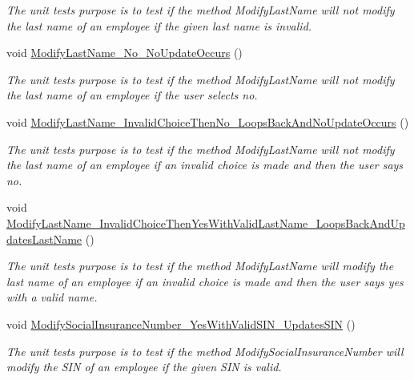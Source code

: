 \begin{DoxyCompactItemize}
\begin{DoxyCompactList}\small\item\em The unit test\textquotesingle{}s purpose is to test if the method Modify\+Last\+Name will not modify the last name of an employee if the given last name is invalid. \end{DoxyCompactList}\item 
void \hyperlink{class_the_company_1_1_tests_1_1_modify_employee_tests_a4c868bee63f88796b8437264a84af46a}{Modify\+Last\+Name\+\_\+\+No\+\_\+\+No\+Update\+Occurs} ()
\begin{DoxyCompactList}\small\item\em The unit test\textquotesingle{}s purpose is to test if the method Modify\+Last\+Name will not modify the last name of an employee if the user selects no. \end{DoxyCompactList}\item 
void \hyperlink{class_the_company_1_1_tests_1_1_modify_employee_tests_ad8c2ed861e1f27869f3eda59afafd157}{Modify\+Last\+Name\+\_\+\+Invalid\+Choice\+Then\+No\+\_\+\+Loops\+Back\+And\+No\+Update\+Occurs} ()
\begin{DoxyCompactList}\small\item\em The unit test\textquotesingle{}s purpose is to test if the method Modify\+Last\+Name will not modify the last name of an employee if an invalid choice is made and then the user says no. \end{DoxyCompactList}\item 
void \hyperlink{class_the_company_1_1_tests_1_1_modify_employee_tests_ae5b1edb34b59a1ba1c29122e1f6e42d5}{Modify\+Last\+Name\+\_\+\+Invalid\+Choice\+Then\+Yes\+With\+Valid\+Last\+Name\+\_\+\+Loops\+Back\+And\+Updates\+Last\+Name} ()
\begin{DoxyCompactList}\small\item\em The unit test\textquotesingle{}s purpose is to test if the method Modify\+Last\+Name will modify the last name of an employee if an invalid choice is made and then the user says yes with a valid name. \end{DoxyCompactList}\item 
void \hyperlink{class_the_company_1_1_tests_1_1_modify_employee_tests_a2fd5de6d8ca788c5c3f2db3db708a55a}{Modify\+Social\+Insurance\+Number\+\_\+\+Yes\+With\+Valid\+S\+I\+N\+\_\+\+Updates\+S\+I\+N} ()
\begin{DoxyCompactList}\small\item\em The unit test\textquotesingle{}s purpose is to test if the method Modify\+Social\+Insurance\+Number will modify the S\+I\+N of an employee if the given S\+I\+N is valid. \end{DoxyCompactList}\item 

\end{DoxyCompactItemize}
